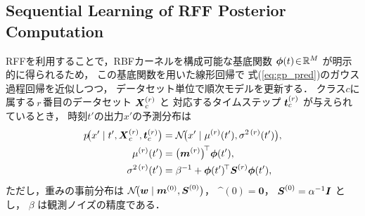 \documentclass[conference]{IEEEtran}
\begin{document}

\subsection{Sequential Learning of RFF Posterior Computation}
RFFを利用することで，RBFカーネルを構成可能な基底関数
${\boldsymbol\phi}(t)\!\in\!\mathbb{R}^{M}$ が明示的に得られるため，
この基底関数を用いた線形回帰で
式(\ref{eq:gp_pred})のガウス過程回帰を近似しつつ，
データセット単位で順次モデルを更新する．
クラス$c$に属する\,$r$\,番目のデータセット  
${ \boldsymbol X}_c^{(r)}$ と
対応するタイムステップ  
${ \boldsymbol t}_c^{(r)}$ が与えられているとき，
時刻$t'$の出力$x'$の予測分布は
\begin{align}
  p\!\bigl(x' \mid t', \bX_c^{(r)}, \bt_c^{(r)}\bigr)
    &= \mathcal{N}\!\bigl(x' \mid \mu^{(r)}(t'), \sigma^{2\,(r)}(t')\bigr),\\
  \mu^{(r)}(t') &= \bigl(\bm^{(r)}\bigr)^{\!\top}\bphi(t')\label{eq:rff_mu},\\
  \sigma^{2\,(r)}(t') &= \beta^{-1}
                        + \bphi(t')^{\!\top}\bS^{(r)}\bphi(t'),
\end{align}
ただし，重みの事前分布は  
$\mathcal{N}\!\bigl({ \boldsymbol w}\mid{ \boldsymbol m}^{(0)},{ \boldsymbol S}^{(0)}\bigr)$，
$\bm^{(0)}=\mathbf{0}$，
${ \boldsymbol S}^{(0)}=\alpha^{-1}{ \boldsymbol I}$ とし，
$\beta$ は観測ノイズの精度である．
\end{document}
